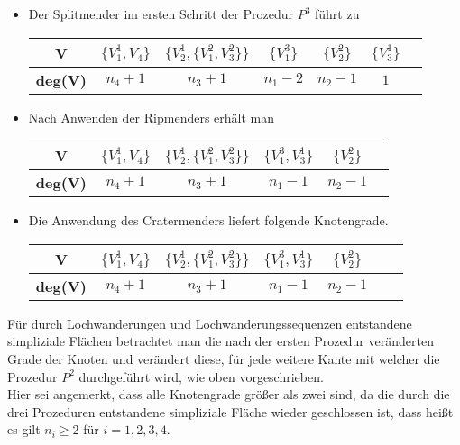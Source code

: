 \documentclass[12pt,titlepage]{article}
\begin{document}
\begin{itemize}
\item Der Splitmender im ersten Schritt der Prozedur $P^3$ führt zu \begin{center}
\begin{tabular}{|c|c|c|c|c|c|c|}
\hline
  \textbf{V} & $\{V_1^1,V_4\}$ & $\{V_2^1,\{V_1^2,V_3^2\}\}$ & $\{V_1^3\}$ & $\{V_2^2\} $  & $\{V_3^1\}$ \\ 
  \hline
   \textbf{deg(V)} & $n_4+1$ & $n_3+1$ & $n_1-2$ & $n_2-1$ & $1$  \\  
   \hline
 \end{tabular}
 \end{center}
\item Nach Anwenden der Ripmenders erhält man \begin{center}
\begin{tabular}{|c|c|c|c|c|c|}
\hline
  \textbf{V} & $\{V_1^1,V_4\}$ & $\{V_2^1,\{V_1^2,V_3^2\}\}$ & $\{V_1^3,V_3^1\}$ & $\{V_2^2\} $   \\ 
  \hline
   \textbf{deg(V)} & $n_4+1$ & $n_3+1$ & $n_1-1$ & $n_2-1$  \\  
   \hline
 \end{tabular}
 \end{center}
\item Die Anwendung des Cratermenders liefert folgende Knotengrade.
\begin{center}
\begin{tabular}{|c|c|c|c|c|c|c|}
\hline
 \textbf{V} & $\{V_1^1,V_4\}$ & $\{V_2^1,\{V_1^2,V_3^2\}\}$ & $\{V_1^3,V_3^1\}$ & $\{V_2^2\} $   \\ 
  \hline
   \textbf{deg(V)} & $n_4+1$ & $n_3+1$ & $n_1-1$ & $n_2-1$  \\  
   \hline
 \end{tabular}
 \end{center}
 \end{itemize}
Für durch Lochwanderungen und Lochwanderungssequenzen entstandene simpliziale Flächen betrachtet man die nach der ersten Prozedur veränderten Grade der Knoten und verändert diese, für jede weitere Kante mit welcher die Prozedur $P^2$ durchgeführt wird, wie oben vorgeschrieben.\\
Hier sei angemerkt, dass alle Knotengrade größer als zwei sind, da die durch die drei Prozeduren entstandene simpliziale Fläche wieder geschlossen ist, dass heißt es gilt $n_i \geq 2$ für $i=1,2,3,4$.\\
\end{document}
